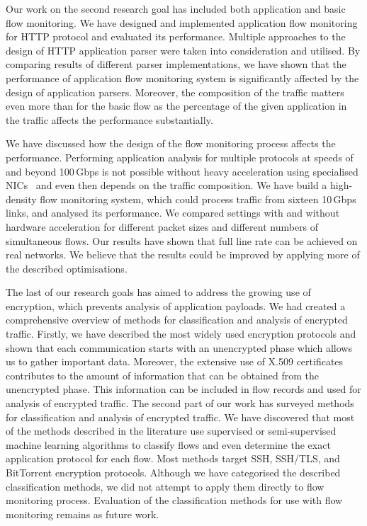Our work on the second research goal has included both application and basic flow monitoring. We have designed and implemented application flow monitoring for HTTP protocol and evaluated its performance. Multiple approaches to the design of HTTP application parser were taken into consideration and utilised. By comparing results of different parser implementations, we have shown that the performance of application flow monitoring system is significantly affected by the design of application parsers. Moreover, the composition of the traffic matters even more than for the basic flow as the percentage of the given application in the traffic affects the performance substantially.

We have discussed how the design of the flow monitoring process affects the performance. Performing application analysis for multiple protocols at speeds of and beyond 100\,Gbps is not possible without heavy acceleration using specialised NICs~\cite{Kekely-2016-Software} and even then depends on the traffic composition. We have build a high-density flow monitoring system, which could process traffic from sixteen 10\,Gbps links, and analysed its performance. We compared settings with and without hardware acceleration for different packet sizes and different numbers of simultaneous flows. Our results have shown that full line rate can be achieved on real networks. We believe that the results could be improved by applying more of the described optimisations.

The last of our research goals has aimed to address the growing use of encryption, which prevents analysis of application payloads. We had created a comprehensive overview of methods for classification and analysis of encrypted traffic. Firstly, we have described the most widely used encryption protocols and shown that each communication starts with an unencrypted phase which allows us to gather important data. Moreover, the extensive use of X.509 certificates contributes to the amount of information that can be obtained from the unencrypted phase. This information can be included in flow records and used for analysis of encrypted traffic. The second part of our work has surveyed methods for classification and analysis of encrypted traffic. We have discovered that most of the methods described in the literature use supervised or semi-supervised machine learning algorithms to classify flows and even determine the exact application protocol for each flow. Most methods target SSH, SSH/TLS, and BitTorrent encryption protocols. Although we have categorised the described classification methods, we did not attempt to apply them directly to flow monitoring process. Evaluation of the classification methods for use with flow monitoring remains as future work.

